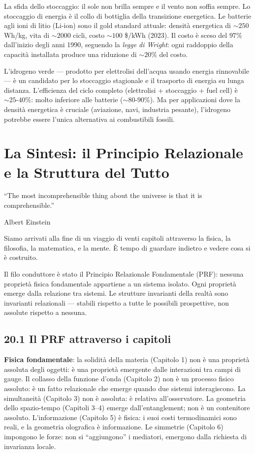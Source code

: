 \documentclass[11.5pt,a4paper,openany]{book}
\theoremstyle{remark}
\begin{document}
La sfida dello stoccaggio: il sole non brilla sempre e il vento non soffia sempre. Lo stoccaggio di energia è il collo di bottiglia della transizione energetica. Le batterie agli ioni di litio (Li-ion) sono il gold standard attuale: densità energetica di $\sim 250$ Wh/kg, vita di $\sim 2000$ cicli, costo $\sim 100$ \$/kWh (2023). Il costo è sceso del $97\%$ dall'inizio degli anni 1990, seguendo la \textit{legge di Wright}: ogni raddoppio della capacità installata produce una riduzione di $\sim 20\%$ del costo.

L'idrogeno verde --- prodotto per elettrolisi dell'acqua usando energia rinnovabile --- è un candidato per lo stoccaggio stagionale e il trasporto di energia su lunga distanza. L'efficienza del ciclo completo (elettrolisi + stoccaggio + fuel cell) è $\sim 25$-$40\%$: molto inferiore alle batterie ($\sim 80$-$90\%$). Ma per applicazioni dove la densità energetica è cruciale (aviazione, navi, industria pesante), l'idrogeno potrebbe essere l'unica alternativa ai combustibili fossili.

\chapter{La Sintesi: il Principio Relazionale e la Struttura del Tutto}

\epigraph{``The most incomprehensible thing about the universe is that it is comprehensible.''}{Albert Einstein}

Siamo arrivati alla fine di un viaggio di venti capitoli attraverso la fisica, la filosofia, la matematica, e la mente. È tempo di guardare indietro e vedere cosa si è costruito.

Il filo conduttore è stato il Principio Relazionale Fondamentale (PRF): nessuna proprietà fisica fondamentale appartiene a un sistema isolato. Ogni proprietà emerge dalla relazione tra sistemi. Le strutture invarianti della realtà sono invarianti relazionali --- stabili rispetto a tutte le possibili prospettive, non assolute rispetto a nessuna.

\section{20.1 Il PRF attraverso i capitoli}

\textbf{Fisica fondamentale}: la solidità della materia (Capitolo 1) non è una proprietà assoluta degli oggetti: è una proprietà emergente dalle interazioni tra campi di gauge. Il collasso della funzione d'onda (Capitolo 2) non è un processo fisico assoluto: è un fatto relazionale che emerge quando due sistemi interagiscono. La simultaneità (Capitolo 3) non è assoluta: è relativa all'osservatore. La geometria dello spazio-tempo (Capitoli 3--4) emerge dall'entanglement; non è un contenitore assoluto. L'informazione (Capitolo 5) è fisica: i suoi costi termodinamici sono reali, e la geometria olografica è informazione. Le simmetrie (Capitolo 6) impongono le forze: non si ``aggiungono'' i mediatori, emergono dalla richiesta di invarianza locale.
\end{document}

